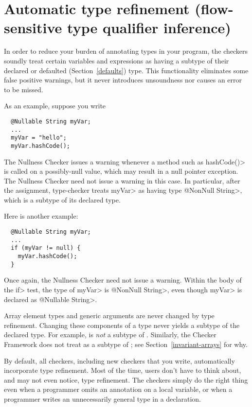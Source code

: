 \section{Automatic type refinement (flow-sensitive type qualifier inference)\label{type-refinement}}

In order to reduce your burden of annotating types in your program, the
checkers soundly treat certain variables and expressions as having a
subtype of their declared or defaulted (Section~\ref{defaults})
type.  This functionality eliminates some false positive warnings, but it
never introduces unsoundness nor causes an error to be missed.

As an example, suppose you write

\begin{Verbatim}
  @Nullable String myVar;
  ...
  myVar = "hello";
  myVar.hashCode();
\end{Verbatim}

\noindent
The Nullness Checker issues a warning whenever a method such as
\<hashCode()> is called on a possibly-null value, which  may result in a
null pointer exception.  The Nullness Checker need not issue a warning in
this case.  In particular, after the assignment, type-checker
treats \<myVar> as having type \<@NonNull String>, which is a subtype of its
declared type.

Here is another example:

\begin{Verbatim}
  @Nullable String myVar;
  ...
  if (myVar != null) {
    myVar.hashCode();
  }
\end{Verbatim}

\noindent
Once again, the Nullness Checker need not issue a warning.  Within the body
of the \<if> test, the type of \<myVar> is \<@NonNull String>, even though
\<myVar> is declared as \<@Nullable String>.


Array element types and generic arguments are never changed by type
refinement.  Changing these components of a type never yields a subtype of
the declared type.  For example,  is \emph{not} a
subtype of .  Similarly, the Checker Framework does not
treat  as a subtype of
; see Section~\ref{invariant-arrays} for why.



By default, all checkers, including new checkers that you write,
automatically incorporate type refinement.  Most of the time, users don't
have to think about, and may not even notice, type refinement.  The
checkers simply do the right thing even when a programmer omits an
annotation on a local variable, or when a programmer writes an
unnecessarily general type in a declaration.

